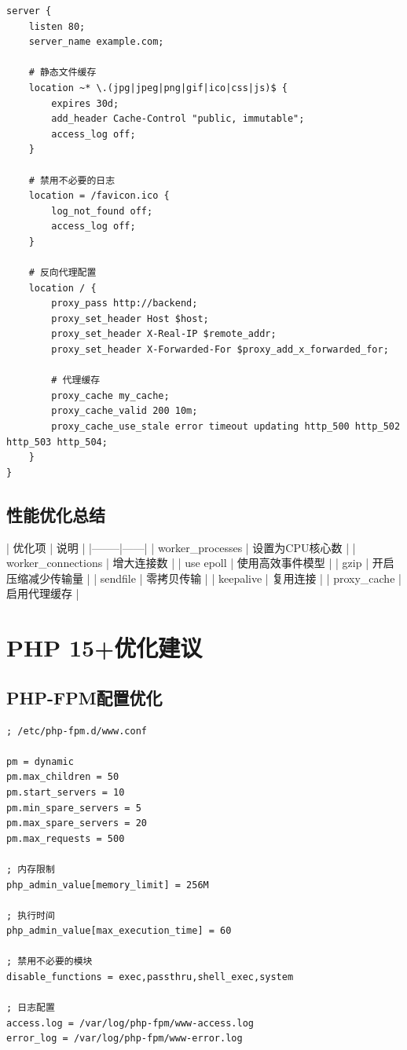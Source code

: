 \documentclass[12pt,UTF8]{ctexbook}
\begin{document}
\begin{lstlisting}
server {
    listen 80;
    server_name example.com;

    # 静态文件缓存
    location ~* \.(jpg|jpeg|png|gif|ico|css|js)$ {
        expires 30d;
        add_header Cache-Control "public, immutable";
        access_log off;
    }

    # 禁用不必要的日志
    location = /favicon.ico {
        log_not_found off;
        access_log off;
    }

    # 反向代理配置
    location / {
        proxy_pass http://backend;
        proxy_set_header Host $host;
        proxy_set_header X-Real-IP $remote_addr;
        proxy_set_header X-Forwarded-For $proxy_add_x_forwarded_for;
        
        # 代理缓存
        proxy_cache my_cache;
        proxy_cache_valid 200 10m;
        proxy_cache_use_stale error timeout updating http_500 http_502 http_503 http_504;
    }
}
\end{lstlisting}

\subsection*{性能优化总结}

| 优化项 | 说明 |
|--------|------|
| worker\_processes | 设置为CPU核心数 |
| worker\_connections | 增大连接数 |
| use epoll | 使用高效事件模型 |
| gzip | 开启压缩减少传输量 |
| sendfile | 零拷贝传输 |
| keepalive | 复用连接 |
| proxy\_cache | 启用代理缓存 |

\section{PHP 15+优化建议}
\label{sec:php-tuning}

\subsection*{PHP-FPM配置优化}

\begin{lstlisting}
; /etc/php-fpm.d/www.conf

pm = dynamic
pm.max_children = 50
pm.start_servers = 10
pm.min_spare_servers = 5
pm.max_spare_servers = 20
pm.max_requests = 500

; 内存限制
php_admin_value[memory_limit] = 256M

; 执行时间
php_admin_value[max_execution_time] = 60

; 禁用不必要的模块
disable_functions = exec,passthru,shell_exec,system

; 日志配置
access.log = /var/log/php-fpm/www-access.log
error_log = /var/log/php-fpm/www-error.log
\end{lstlisting}
\end{document}
